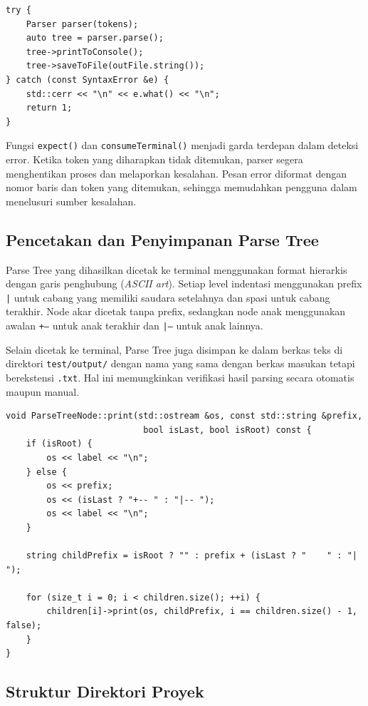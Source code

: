 ﻿\documentclass[12pt,a4paper]{article}
\begin{document}
\begin{lstlisting}[style=cpp, caption={Penanganan error di main.cpp}]
try {
    Parser parser(tokens);
    auto tree = parser.parse();
    tree->printToConsole();
    tree->saveToFile(outFile.string());
} catch (const SyntaxError &e) {
    std::cerr << "\n" << e.what() << "\n";
    return 1;
}
\end{lstlisting}

Fungsi \texttt{expect()} dan \texttt{consumeTerminal()} menjadi garda terdepan dalam deteksi error. Ketika token yang diharapkan tidak ditemukan, parser segera menghentikan proses dan melaporkan kesalahan. Pesan error diformat dengan nomor baris dan token yang ditemukan, sehingga memudahkan pengguna dalam menelusuri sumber kesalahan.

\subsection{Pencetakan dan Penyimpanan Parse Tree}

Parse Tree yang dihasilkan dicetak ke terminal menggunakan format hierarkis dengan garis penghubung (\textit{ASCII art}). Setiap level indentasi menggunakan prefix \texttt{|} untuk cabang yang memiliki saudara setelahnya dan spasi untuk cabang terakhir. Node akar dicetak tanpa prefix, sedangkan node anak menggunakan awalan \texttt{+--} untuk anak terakhir dan \texttt{|--} untuk anak lainnya.

Selain dicetak ke terminal, Parse Tree juga disimpan ke dalam berkas teks di direktori \texttt{test/output/} dengan nama yang sama dengan berkas masukan tetapi berekstensi \texttt{.txt}. Hal ini memungkinkan verifikasi hasil parsing secara otomatis maupun manual.

\begin{lstlisting}[style=cpp, caption={Fungsi pencetakan Parse Tree}]
void ParseTreeNode::print(std::ostream &os, const std::string &prefix,
                           bool isLast, bool isRoot) const {
    if (isRoot) {
        os << label << "\n";
    } else {
        os << prefix;
        os << (isLast ? "+-- " : "|-- ");
        os << label << "\n";
    }

    string childPrefix = isRoot ? "" : prefix + (isLast ? "    " : "|   ");

    for (size_t i = 0; i < children.size(); ++i) {
        children[i]->print(os, childPrefix, i == children.size() - 1, false);
    }
}
\end{lstlisting}

\subsection{Struktur Direktori Proyek}
\end{document}
